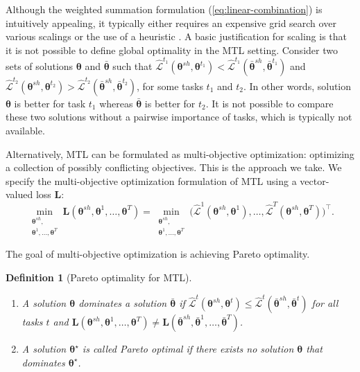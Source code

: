 \documentclass{article}
\newtheorem{definition}{Definition}
\def\LL{\mathbf{L}}
\def\lL{\mathcal{L}}
\def\btheta{{\bm\theta}}
\begin{document}
Although the weighted summation formulation (\ref{eq:linear-combination}) is intuitively appealing, it typically either requires an expensive grid search over various scalings or the use of a heuristic \citep{Kendall2018, Chen2018}. A basic justification for scaling is that it is not possible to define global optimality in the MTL setting. Consider two sets of solutions $\btheta$ and $\bar{\btheta}$ such that $\hat{\lL}^{t_1}(\btheta^{sh},\btheta^{t_1}) < \hat{\lL}^{t_1}(\bar{\btheta}^{sh},\bar{\btheta}^{t_1})$ and $\hat{\lL}^{t_2}(\btheta^{sh},\btheta^{t_2}) > \hat{\lL}^{t_2}(\bar{\btheta}^{sh},\bar{\btheta}^{t_2})$, for some tasks $t_1$ and $t_2$. In other words, solution $\btheta$ is better for task $t_1$ whereas $\bar{\btheta}$ is better for $t_2$. It is not possible to compare these two solutions without a pairwise importance of tasks, which is typically not available.

Alternatively, MTL can be formulated as multi-objective optimization: optimizing a collection of possibly conflicting objectives. This is the approach we take. We specify the multi-objective optimization formulation of MTL using a vector-valued loss $\LL$:
\begin{equation}
\min_{\substack{\btheta^{sh},\\ \btheta^1,\ldots,\btheta^T}} \LL(\btheta^{sh}, \btheta^1,\ldots,\btheta^T) =
\min_{\substack{\btheta^{sh},\\ \btheta^1,\ldots,\btheta^T}} \big( \hat{\lL}^1(\btheta^{sh},\btheta^1), \ldots,  \hat{\lL}^T(\btheta^{sh},\btheta^T) \big)^\intercal .
\end{equation}

The goal of multi-objective optimization is achieving Pareto optimality.


\begin{definition}[Pareto optimality for MTL] {\ }\begin{enumerate}[ topsep=0pt, label=\emph{(\alph*)},align=left,leftmargin=*]
\item A solution $\btheta$ dominates a solution $\bar{\btheta}$ if \mbox{$\hat{\lL}^t(\btheta^{sh},\btheta^t)  \leq \hat{\lL}^t(\bar{\btheta}^{sh},\bar{\btheta}^t)$} for all tasks $t$ and \mbox{$\LL(\btheta^{sh}, \btheta^1,\ldots,\btheta^T) \neq\LL(\bar{\btheta}^{sh}, \bar{\btheta}^1,\ldots,\bar{\btheta}^T) $}.
\item A solution $\btheta^\star$ is called Pareto optimal if there exists no solution $\btheta$ that dominates $\btheta^\star$.
\end{enumerate}
\end{definition}
\end{document}
